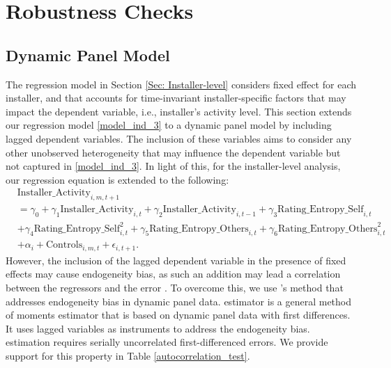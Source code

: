 \documentclass[msom,blindrev]{informs3}
\begin{document}
	
	
\section{Robustness Checks} \label{Sec: Robustness}
	
	\subsection{Dynamic Panel Model}
	
	The regression model in Section \ref{Sec: Installer-level} considers fixed effect for each installer, and that accounts for time-invariant installer-specific factors that may impact the dependent variable, i.e., installer's activity level. This section extends our regression model  \eqref{model_ind_3} to a dynamic panel model by including lagged dependent variables. The inclusion of these variables aims to consider any other unobserved heterogeneity that may influence the dependent variable but not captured in  \eqref{model_ind_3}. In light of this, for the installer-level analysis, our regression equation is extended to the following:
	\begin{align} \nonumber
	&\text{Installer\_Activity}_{i,m,t+1} \\ \nonumber
	&=\gamma_{0}+\gamma_{1} \text{Installer\_Activity}_{i,t}+ \gamma_{2}\text{Installer\_Activity}_{i,t-1}+
	\gamma_{3} \text{Rating\_Entropy\_Self}_{i,t} \\ \nonumber
	&+ \gamma_{4} \text{Rating\_Entropy\_Self}_{i,t}^ {2} + \gamma_{5} \text{Rating\_Entropy\_Others}_{i,t}  + \gamma_{6} \text{Rating\_Entropy\_Others}_{i,t}^{2} \\ \label{eq: extended_ind}
	&+ \alpha_{i}+ \text{Controls}_{i,m,t}+ \epsilon_{i,t+1}.
	\end{align}
However,  the inclusion of the lagged dependent variable in the presence of fixed effects may cause endogeneity bias, as such an addition may lead a correlation between the regressors and the error \citep{nickell1981biases}. To overcome this, we use \cite{arellano1991some}'s method that addresses endogeneity bias in dynamic panel data. \cite{arellano1991some} estimator is a general method of moments estimator that is based on dynamic panel data with first differences. It uses lagged variables as instruments to address the endogeneity bias. \cite{arellano1991some} estimation requires serially uncorrelated first-differenced errors. We provide support for this property in Table \ref{autocorrelation_test}.
	
\end{document}
